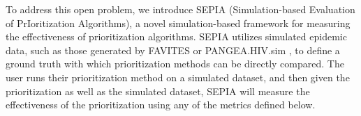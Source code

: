 \documentclass[twocolumn]{bmcart}%
\begin{document}
To address this open problem, we introduce SEPIA (Simulation-based Evaluation of PrIoritization Algorithms), a novel simulation-based framework for measuring the effectiveness of prioritization algorithms. SEPIA utilizes simulated epidemic data, such as those generated by FAVITES \cite{moshiri2018favites} or PANGEA.HIV.sim \cite{ratmann2016phylogenetic}, to define a ground truth with which prioritization methods can be directly compared. The user runs their prioritization method on a simulated dataset, and then given the prioritization as well as the simulated dataset, SEPIA will measure the effectiveness of the prioritization using any of the metrics defined below.

\end{document}
